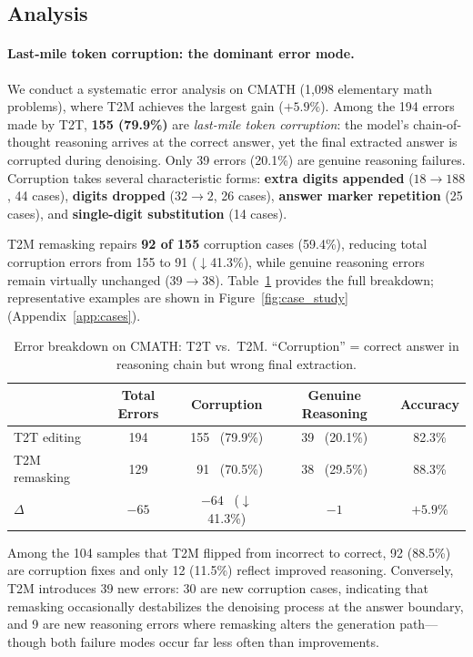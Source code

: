 \documentclass{article}
\newcommand{\TtoT}{\textrm{T2T}}
\newcommand{\TtoM}{\textrm{T2M}}
\begin{document}
\subsection{Analysis}
\label{sec:analysis}

\paragraph{Last-mile token corruption: the dominant error mode.}
We conduct a systematic error analysis on CMATH (1,098 elementary math problems), where \TtoM{} achieves the largest gain ($+5.9\%$). Among the 194 errors made by \TtoT{}, \textbf{155 (79.9\%)} are \emph{last-mile token corruption}: the model's chain-of-thought reasoning arrives at the correct answer, yet the final extracted answer is corrupted during denoising. Only 39 errors (20.1\%) are genuine reasoning failures. Corruption takes several characteristic forms: \textbf{extra digits appended} ($18 \to 188$, 44 cases), \textbf{digits dropped} ($32 \to 2$, 26 cases), \textbf{answer marker repetition} (25 cases), and \textbf{single-digit substitution} (14 cases).

\TtoM{} remasking repairs \textbf{92 of 155} corruption cases (59.4\%), reducing total corruption errors from 155 to 91 ($\downarrow$41.3\%), while genuine reasoning errors remain virtually unchanged (39$\to$38). Table~\ref{tab:corruption} provides the full breakdown; representative examples are shown in Figure~\ref{fig:case_study} (Appendix~\ref{app:cases}).

\begin{table}[t]
\centering
\caption{Error breakdown on CMATH: \TtoT{} vs.\ \TtoM{}. ``Corruption'' = correct answer in reasoning chain but wrong final extraction.}
\label{tab:corruption}
\vspace{4pt}
\small
\begin{tabular}{lcccc}
\toprule
& \textbf{Total Errors} & \textbf{Corruption} & \textbf{Genuine Reasoning} & \textbf{Accuracy} \\
\midrule
\TtoT{} editing   & 194  & 155 ~(79.9\%)  & 39 ~(20.1\%)  & 82.3\% \\
\TtoM{} remasking  & 129  & ~91 ~(70.5\%)  & 38 ~(29.5\%)  & 88.3\% \\
\midrule
$\Delta$           & $-65$ & $-64$ ~($\downarrow$41.3\%) & $-1$ & $+5.9\%$ \\
\bottomrule
\end{tabular}
\end{table}

Among the 104 samples that \TtoM{} flipped from incorrect to correct, 92 (88.5\%) are corruption fixes and only 12 (11.5\%) reflect improved reasoning. Conversely, \TtoM{} introduces 39 new errors: 30 are new corruption cases, indicating that remasking occasionally destabilizes the denoising process at the answer boundary, and 9 are new reasoning errors where remasking alters the generation path---though both failure modes occur far less often than improvements.
\end{document}
